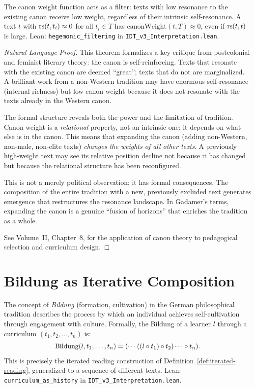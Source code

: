 \begin{theorem}
\label{thm:hegemonic-filtering}
The canon weight function acts as a filter: texts with low resonance
to the existing canon receive low weight, regardless of their intrinsic
self-resonance.  A text $t$ with $\mathrm{rs}(t, t_i) \approx 0$ for all $t_i \in T$
has $\mathrm{canonWeight}(t, T) \approx 0$, even if $\mathrm{rs}(t, t)$ is large.
Lean: \texttt{hegemonic\_filtering} in \texttt{IDT\_v3\_Interpretation.lean}.
\end{theorem}

\begin{proof}[Natural Language Proof]
This theorem formalizes a key critique from postcolonial and feminist
literary theory: the canon is self-reinforcing.  Texts that resonate with
the existing canon are deemed ``great''; texts that do not are marginalized.
A brilliant work from a non-Western tradition may have enormous
self-resonance (internal richness) but low canon weight because it does
not resonate with the texts already in the Western canon.

The formal structure reveals both the power and the limitation of tradition.
Canon weight is a \emph{relational} property, not an intrinsic one: it
depends on what else is in the canon.  This means that expanding the canon
(adding non-Western, non-male, non-elite texts) \emph{changes the weights
of all other texts}.  A previously high-weight text may see its relative
position decline not because it has changed but because the relational
structure has been reconfigured.

This is not a merely political observation; it has formal consequences.
The composition of the entire tradition with a new, previously excluded
text generates emergence that restructures the resonance landscape.  In
Gadamer's terms, expanding the canon is a genuine ``fusion of horizons''
that enriches the tradition as a whole.

See Volume~II, Chapter~8, for the application of canon theory to
pedagogical selection and curriculum design.
\end{proof}

\section{Bildung as Iterative Composition}

\begin{definition}
\label{def:bildung}
The concept of \textit{Bildung} (formation, cultivation) in the
German philosophical tradition describes the process by which an individual
achieves self-cultivation through engagement with culture.  Formally, the
Bildung of a learner $l$ through a curriculum $(t_1, t_2, \ldots, t_n)$ is:
\[
\mathrm{Bildung}(l, t_1, \ldots, t_n) = (\cdots((l \circ t_1) \circ t_2) \cdots \circ t_n).
\]
This is precisely the iterated reading construction of
Definition~\ref{def:iterated-reading}, generalized to a sequence of
different texts.
Lean: \texttt{curriculum\_as\_history} in \texttt{IDT\_v3\_Interpretation.lean}.
\end{definition}

